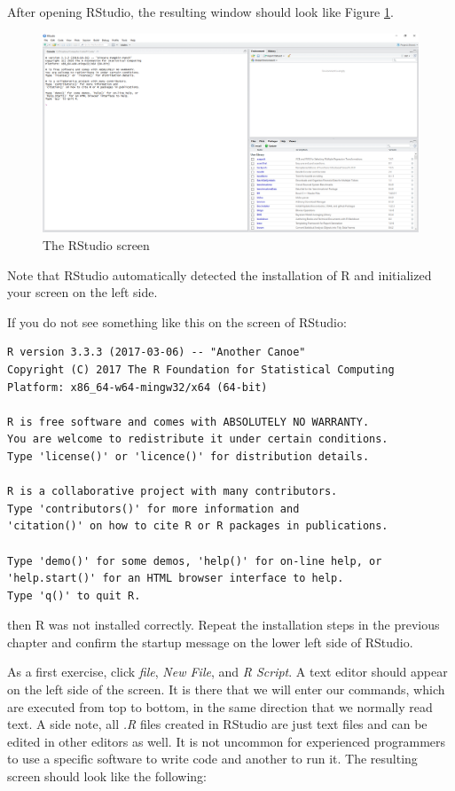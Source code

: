 \documentclass[11pt,]{book}
\begin{document}
After opening RStudio, the resulting window should look like Figure
\ref{fig:RStudio1}.

\begin{figure}[!htbp]

{\centering \includegraphics[width=1\linewidth]{figs/RStudio1} 

}

\caption{The RStudio screen}\label{fig:RStudio1}
\end{figure}

Note that RStudio automatically detected the installation of R and
initialized your screen on the left side.

If you do not see something like this on the screen of RStudio:

\begin{verbatim}
R version 3.3.3 (2017-03-06) -- "Another Canoe"
Copyright (C) 2017 The R Foundation for Statistical Computing
Platform: x86_64-w64-mingw32/x64 (64-bit)

R is free software and comes with ABSOLUTELY NO WARRANTY.
You are welcome to redistribute it under certain conditions.
Type 'license()' or 'licence()' for distribution details.

R is a collaborative project with many contributors.
Type 'contributors()' for more information and
'citation()' on how to cite R or R packages in publications.

Type 'demo()' for some demos, 'help()' for on-line help, or
'help.start()' for an HTML browser interface to help.
Type 'q()' to quit R.
\end{verbatim}

then R was not installed correctly. Repeat the installation steps in the
previous chapter and confirm the startup message on the lower left side
of RStudio.

As a first exercise, click \emph{file}, \emph{New File}, and \emph{R
Script}. A text editor should appear on the left side of the screen. It
is there that we will enter our commands, which are executed from top to
bottom, in the same direction that we normally read text. A side note,
all \emph{.R} files created in RStudio are just text files and can be
edited in other editors as well. It is not uncommon for experienced
programmers to use a specific software to write code and another to run
it. The resulting screen should look like the following:
\end{document}

